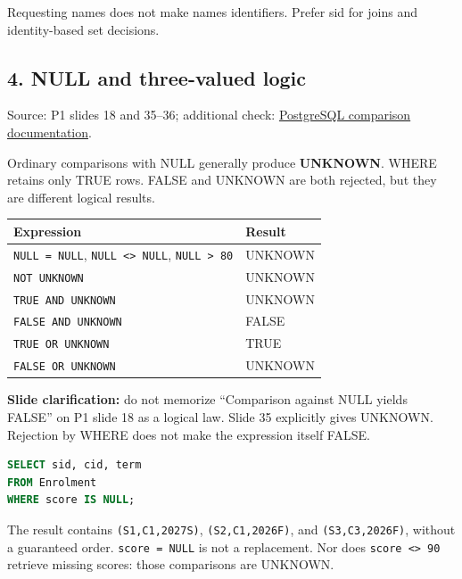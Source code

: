 Requesting names does not make names identifiers. Prefer sid for joins and identity-based set decisions.

\Needspace{11cm}
\subsection{4. NULL and three-valued logic}\label{06_sql_queries_en-null-and-three-valued-logic}


Source: P1 slides 18 and 35--36; additional check: \href{https://www.postgresql.org/docs/18/functions-comparison.html}{PostgreSQL comparison documentation}.

Ordinary comparisons with NULL generally produce \textbf{UNKNOWN}. WHERE retains only TRUE rows. FALSE and UNKNOWN are both rejected, but they are different logical results.

\begin{longtable}[]{@{}ll@{}}
\toprule\noalign{}
Expression & Result \\
\midrule\noalign{}
\endhead
\bottomrule\noalign{}
\endlastfoot
\texttt{NULL\ =\ NULL}, \texttt{NULL\ \textless{}\textgreater{}\ NULL}, \texttt{NULL\ \textgreater{}\ 80} & UNKNOWN \\
\texttt{NOT\ UNKNOWN} & UNKNOWN \\
\texttt{TRUE\ AND\ UNKNOWN} & UNKNOWN \\
\texttt{FALSE\ AND\ UNKNOWN} & FALSE \\
\texttt{TRUE\ OR\ UNKNOWN} & TRUE \\
\texttt{FALSE\ OR\ UNKNOWN} & UNKNOWN \\
\end{longtable}

\textbf{Slide clarification:} do not memorize ``Comparison against NULL yields FALSE'' on P1 slide 18 as a logical law. Slide 35 explicitly gives UNKNOWN. Rejection by WHERE does not make the expression itself FALSE.

\Needspace{75pt}
\begin{lstlisting}[language=SQL]
SELECT sid, cid, term
FROM Enrolment
WHERE score IS NULL;
\end{lstlisting}

The result contains \texttt{(\allowbreak{}S1,\allowbreak{}C1,\allowbreak{}2027S)\allowbreak{}}, \texttt{(\allowbreak{}S2,\allowbreak{}C1,\allowbreak{}2026F)\allowbreak{}}, and \texttt{(\allowbreak{}S3,\allowbreak{}C3,\allowbreak{}2026F)\allowbreak{}}, without a guaranteed order. \texttt{score\ =\ NULL} is not a replacement. Nor does \texttt{score\ \textless{}\textgreater{}\ 90} retrieve missing scores: those comparisons are UNKNOWN.

